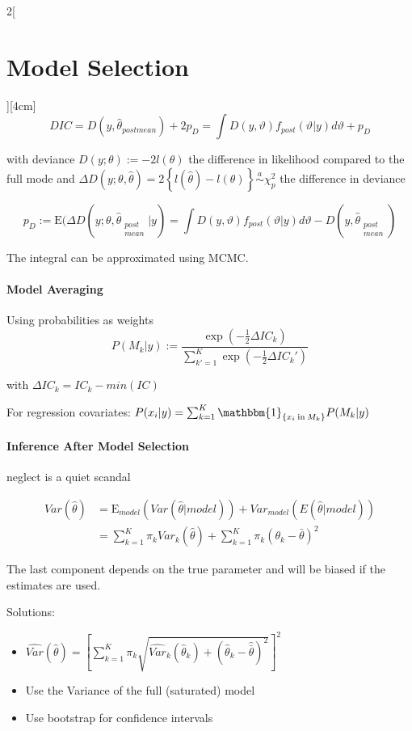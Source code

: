 \documentclass[8pt]{extarticle}
\begin{document}
\begin{multicols}{2}[\section{Model Selection}][4cm]
$$DIC = D(y,\hat{\theta}_{postmean}) + 2p_D = \int D(y,\vartheta)f_{post}(\vartheta|y)d\vartheta + p_D$$

\noindent with deviance $D(y;\theta) := -2l(\theta)$ the difference in likelihood compared to the full mode and $\Delta D(y;\theta,\hat{\theta}) = 2\left\{l(\hat{\theta}) {-} l(\theta)\right\} \overset{a}{\sim}\chi_p^2$ the difference in deviance

$$p_D := \mathrm{E}(\Delta D(y;\theta, \hat{\theta}_{\substack{post \\ mean}}|y) = \int\!\! D(y,\vartheta)f_{post}(\vartheta|y)d\vartheta {-} D(y,\hat{\theta}_{\substack{post \\ mean}})$$

\noindent The integral can be approximated using MCMC.

\paragraph{Model Averaging} Using probabilities as weights
$$P(M_k|y) := \frac{\exp(-\frac{1}{2}\Delta IC_k)}{\sum_{k' =1}^K\exp(-\frac{1}{2}\Delta IC_k')}$$

with $\Delta IC_k = IC_k - min(IC)$

\noindent For regression covariates: $P(x_i|y) = \sum_{k=1}^K \mathbbm{1}_{\{x_i \:\text{in}\: M_k\}}P(M_k|y)$

\paragraph{Inference After Model Selection} neglect is a quiet scandal

\begin{align*}
Var(\hat{\theta}) &= \mathrm{E}_{model}(Var(\hat{\theta}|model)) + Var_{model}(E(\hat{\theta}|model))\\
&= \sum_{k=1}^K \pi_kVar_k(\hat{\theta}) + \sum_{k=1}^K \pi_k(\theta_k-\bar{\theta})^2
\end{align*}

\noindent The last component depends on the true parameter and will be biased if the estimates are used.

Solutions:
\begin{itemize}
\item $\widehat{Var}(\hat{\theta}) = \left[ \sum_{k=1}^K \pi_k \sqrt{\widehat{Var}_k(\hat{\theta}_k) + (\hat{\theta}_k - \hat{\bar{\theta}})^2}\right]^2$
\item Use the Variance of the full (saturated) model
\item Use bootstrap for confidence intervals
\end{itemize}


\end{multicols}
\end{document}
